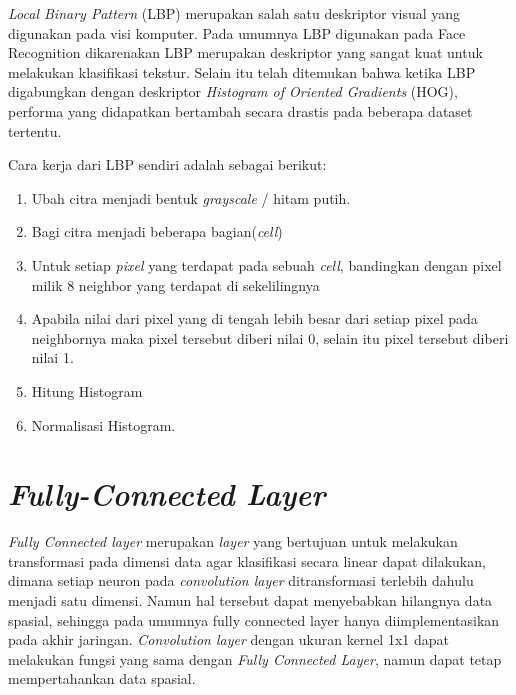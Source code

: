 \textit{Local Binary Pattern} (LBP) merupakan salah satu deskriptor visual yang digunakan pada visi komputer. Pada umumnya LBP digunakan pada Face Recognition dikarenakan LBP merupakan deskriptor yang sangat kuat untuk melakukan klasifikasi tekstur. Selain itu telah ditemukan bahwa ketika LBP digabungkan dengan deskriptor \textit{Histogram of Oriented Gradients} (HOG), performa yang didapatkan bertambah secara drastis pada beberapa dataset tertentu.

\par Cara kerja dari LBP sendiri adalah sebagai berikut:
\begin{enumerate}
	\vspace{-2mm}
	\item Ubah citra menjadi bentuk \textit{grayscale} / hitam putih.
	\vspace{-2mm}
	\item Bagi citra menjadi beberapa bagian(\textit{cell})
	\vspace{-2mm}
	\item Untuk setiap \textit{pixel} yang terdapat pada sebuah \textit{cell}, bandingkan dengan pixel milik 8 neighbor yang terdapat di sekelilingnya
	\vspace{-2mm}
	\item Apabila nilai dari pixel yang di tengah lebih besar dari setiap pixel pada neighbornya maka pixel tersebut diberi nilai 0, selain itu pixel tersebut diberi nilai 1.
	\vspace{-2mm}
	\item Hitung Histogram
	\vspace{-2mm}
	\item Normalisasi Histogram.
\end{enumerate}

\vspace{1ex}

\section{\textit{Fully-Connected Layer}}
\vspace{1ex}
\textit{Fully Connected layer} merupakan \textit{layer} yang bertujuan untuk melakukan transformasi pada dimensi data agar klasifikasi secara linear dapat dilakukan, dimana setiap neuron pada \textit{convolution layer} ditransformasi terlebih dahulu menjadi satu dimensi. Namun hal tersebut dapat menyebabkan hilangnya data spasial, sehingga pada umumnya fully connected layer hanya diimplementasikan pada akhir jaringan. \textit{Convolution layer} dengan ukuran kernel 1x1 dapat melakukan fungsi yang sama dengan \textit{Fully Connected Layer}, namun dapat tetap mempertahankan data spasial.
\vspace{1ex}

